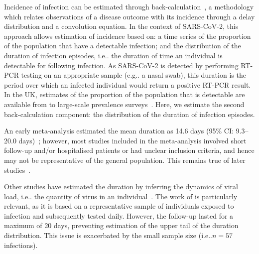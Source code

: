 \documentclass[12pt]{article}
\makeatletter
\DeclareRobustCommand\onedot{\futurelet\@let@token\@onedot}
\def\@onedot{\ifx\@let@token.\else.\null\fi\xspace}
\def\eg{e.g\onedot} \def\Eg{{E.g}\onedot}
\def\ie{i.e\onedot} \def\Ie{{I.e}\onedot}
\makeatother
\begin{document}
Incidence of infection can be estimated through back-calculation~\citep{brookmeyerBackcalculation}, a methodology which relates observations of a disease outcome with its incidence through a delay distribution and a convolution equation.
In the context of SARS-CoV-2, this approach allows estimation of incidence based on: a time series of the proportion of the population that have a detectable infection; and the distribution of the duration of infection episodes, \ie the duration of time an individual is detectable for following infection.
As SARS-CoV-2 is detected by performing RT-PCR testing on an appropriate sample (\eg a nasal swab), this duration is the period over which an infected individual would return a positive RT-PCR result.
In the UK, estimates of the proportion of the population that is detectable are available from to large-scale prevalence surveys~\citep{cisMethodsONS,rileyREACT}.
Here, we estimate the second back-calculation component: the distribution of the duration of infection episodes.



An early meta-analysis estimated the mean duration as 14.6 days (95\% CI: 9.3--20.0 days)~\citep{cevikShedding}; however, most studies included in the meta-analysis involved short follow-up and/or hospitalised patients or had unclear inclusion criteria, and hence may not be representative of the general population.
This remains true of later studies~\citep[e.g.][]{ealesCharacterising,hellewellPCRSensitivity}.

Other studies have estimated the duration by inferring the dynamics of viral load, \ie the quantity of virus in an individual~\citep[e.g.][]{kisslerViral,hakkiOnset,blakeThesis}.
The work of \citet{hakkiOnset} is particularly relevant, as it is based on a representative sample of individuals exposed to infection and subsequently tested daily.
However, the follow-up lasted for a maximum of 20 days, preventing estimation of the upper tail of the duration distribution.
This issue is exacerbated by the small sample size (\ie $n= 57$ infections).
\end{document}
